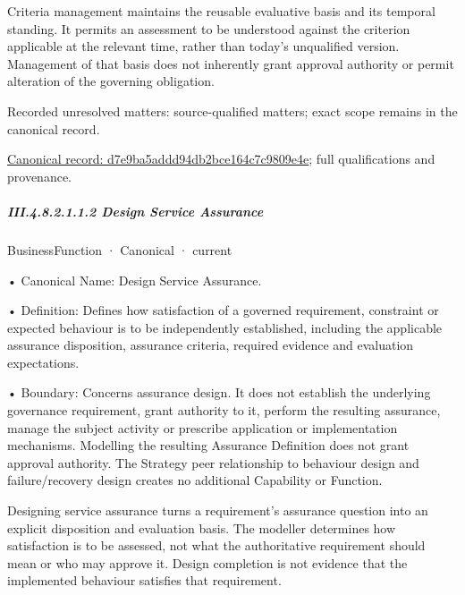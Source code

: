 Criteria management maintains the reusable evaluative basis and its temporal standing. It permits an assessment to be understood against the criterion applicable at the relevant time, rather than today's unqualified version. Management of that basis does not inherently grant approval authority or permit alteration of the governing obligation.


{\small Recorded unresolved matters: source-qualified matters; exact scope remains in the canonical record.}\par
{\footnotesize \href{../../../../continuum/business/business-function/d7e9ba5addd94db2bce164c7c9809e4e.md}{Canonical record: d7e9ba5addd94db2bce164c7c9809e4e}; full qualifications and provenance.}\par
\subparagraph*{III.4.8.2.1.1.2 Design Service Assurance}
\label{navigation:III.4.8.2.1.1.2}

\label{element:6668aa8daf964fec93fce42d48b37ad1}
{\small BusinessFunction · Canonical · current}\par

•
Canonical Name: Design Service Assurance.



•
Definition: Defines how satisfaction of a governed requirement, constraint or expected behaviour is to be independently established, including the applicable assurance disposition, assurance criteria, required evidence and evaluation expectations.



•
Boundary: Concerns assurance design. It does not establish the underlying governance requirement, grant authority to it, perform the resulting assurance, manage the subject activity or prescribe application or implementation mechanisms. Modelling the resulting Assurance Definition does not grant approval authority. The Strategy peer relationship to behaviour design and failure/recovery design creates no additional Capability or Function.



Designing service assurance turns a requirement's assurance question into an explicit disposition and evaluation basis. The modeller determines how satisfaction is to be assessed, not what the authoritative requirement should mean or who may approve it. Design completion is not evidence that the implemented behaviour satisfies that requirement.


